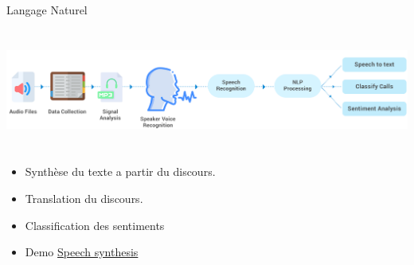 \documentclass{beamer}
\begin{document}

\begin{frame}[t]{Langage Naturel}
     
\includegraphics[width=0.9\linewidth,height=4cm]{./images/speech_recognition_1.png}

\begin{itemize}
  \item Synthèse du texte a partir du discours.
  \item Translation du discours.
  \item Classification des sentiments
  \item Demo
    \href{https://text-to-speech-demo.ng.bluemix.net/}{\alert{Speech
    synthesis}}
\end{itemize}
\end{frame}
\end{document}
